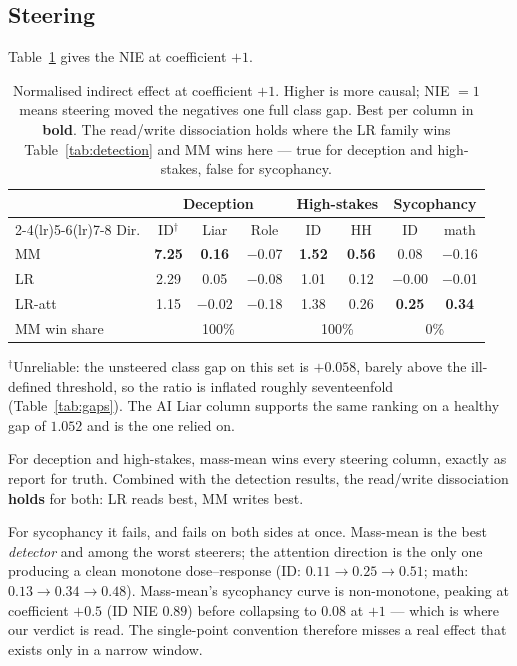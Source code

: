 \documentclass[conference]{IEEEtran}
\begin{document}
\subsection{Steering}

Table~\ref{tab:steering} gives the NIE at coefficient $+1$.

\begin{table}[t]
\caption{Normalised indirect effect at coefficient $+1$. Higher is more causal;
NIE $=1$ means steering moved the negatives one full class gap. Best per column
in \textbf{bold}. The read/write dissociation holds where the LR family wins
Table~\ref{tab:detection} and MM wins here --- true for deception and
high-stakes, false for sycophancy.}
\label{tab:steering}
\centering
\small
\begin{tabular}{lccccccc}
\toprule
& \multicolumn{3}{c}{\textbf{Deception}} & \multicolumn{2}{c}{\textbf{High-stakes}} & \multicolumn{2}{c}{\textbf{Sycophancy}} \\
\cmidrule(lr){2-4}\cmidrule(lr){5-6}\cmidrule(lr){7-8}
Dir. & ID$^{\dagger}$ & Liar & Role & ID & HH & ID & math \\
\midrule
MM  & \textbf{7.25} & \textbf{0.16} & $-$0.07 & \textbf{1.52} & \textbf{0.56} & 0.08 & $-$0.16 \\
LR  & 2.29 & 0.05 & $-$0.08 & 1.01 & 0.12 & $-$0.00 & $-$0.01 \\
LR-att & 1.15 & $-$0.02 & $-$0.18 & 1.38 & 0.26 & \textbf{0.25} & \textbf{0.34} \\
\midrule
MM win share & \multicolumn{3}{c}{100\%} & \multicolumn{2}{c}{100\%} & \multicolumn{2}{c}{0\%} \\
\bottomrule
\end{tabular}
\smallskip
\footnotesize
$^{\dagger}$Unreliable: the unsteered class gap on this set is $+0.058$, barely
above the ill-defined threshold, so the ratio is inflated roughly seventeenfold
(Table~\ref{tab:gaps}). The AI Liar column supports the same ranking on a
healthy gap of $1.052$ and is the one relied on.
\end{table}

For deception and high-stakes, mass-mean wins every steering column, exactly as
\citeauthor{marks2024} report for truth. Combined with the detection results,
the read/write dissociation \textbf{holds} for both: LR reads best, MM writes
best.

For sycophancy it fails, and fails on both sides at once. Mass-mean is the best
\emph{detector} and among the worst steerers; the attention direction is the
only one producing a clean monotone dose--response (ID: $0.11 \to 0.25 \to
0.51$; math: $0.13 \to 0.34 \to 0.48$). Mass-mean's sycophancy curve is
non-monotone, peaking at coefficient $+0.5$ (ID NIE $0.89$) before collapsing to
$0.08$ at $+1$ --- which is where our verdict is read. The single-point
convention therefore misses a real effect that exists only in a narrow window.
\end{document}
